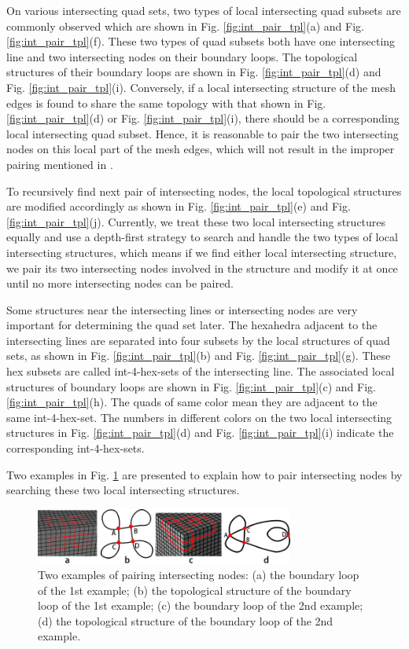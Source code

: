 \documentclass[final,5p,times,twocolumn]{elsarticle}
\begin{document}
On various intersecting quad sets, two types of local intersecting quad subsets are commonly observed which are shown in Fig. \ref{fig:int_pair_tpl}(a) and Fig. \ref{fig:int_pair_tpl}(f). These two types of quad subsets both have one intersecting line and two intersecting nodes on their boundary loops. The topological structures of their boundary loops are shown in Fig. \ref{fig:int_pair_tpl}(d) and Fig. \ref{fig:int_pair_tpl}(i). Conversely, if a local intersecting structure of the mesh edges is found to share the same topology with that shown in Fig. \ref{fig:int_pair_tpl}(d) or Fig. \ref{fig:int_pair_tpl}(i), there should be a corresponding local intersecting quad subset. Hence, it is reasonable to pair the two intersecting nodes on this local part of the mesh edges, which will not result in the improper pairing mentioned in \cite{Suzuki:2010hn}.

To recursively find next pair of intersecting nodes, the local topological structures are modified accordingly as shown in Fig. \ref{fig:int_pair_tpl}(e) and Fig. \ref{fig:int_pair_tpl}(j). Currently, we treat these two local intersecting structures equally and use a depth-first strategy to search and handle the two types of local intersecting structures, which means if we find either local intersecting structure, we pair its two intersecting nodes involved in the structure and modify it at once until no more intersecting nodes can be paired.

Some structures near the intersecting lines or intersecting nodes are very important for determining the quad set later. The hexahedra adjacent to the intersecting lines are separated into four subsets by the local structures of quad sets, as shown in Fig. \ref{fig:int_pair_tpl}(b) and Fig. \ref{fig:int_pair_tpl}(g). These hex subsets are called int-4-hex-sets of the intersecting line. The associated local structures of boundary loops are shown in Fig. \ref{fig:int_pair_tpl}(c) and Fig. \ref{fig:int_pair_tpl}(h). The quads of same color mean they are adjacent to the same int-4-hex-set. The numbers in different colors on the two local intersecting structures in Fig. \ref{fig:int_pair_tpl}(d) and Fig. \ref{fig:int_pair_tpl}(i) indicate the corresponding int-4-hex-sets.

Two examples in Fig. \ref{fig:pair_int_exams} are presented to explain how to pair intersecting nodes by searching these two local intersecting structures.

\begin{figure}[htbp]
\begin{center}
\includegraphics[width=8.5cm]{pmatchexams.png}
\caption{Two examples of pairing intersecting nodes: (a) the boundary loop of the 1st example; (b) the topological structure of the boundary loop of the 1st example; (c) the boundary loop of the 2nd example; (d) the topological structure of the boundary loop of the 2nd example.}
\label{fig:pair_int_exams}
\end{center}
\end{figure}
\end{document}
